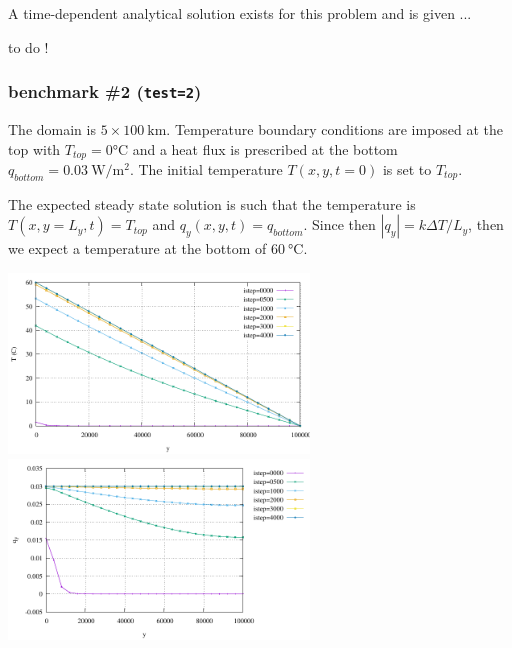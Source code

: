 A time-dependent analytical solution exists for this problem and is given ...

{\color{red} to do !}

\subsubsection*{benchmark \#2 ({\tt test=2})}

The domain is $5\times 100~\si{\km}$. 
Temperature boundary conditions are imposed at the top with 
$T_{top}=0\si{\celsius}$
and a heat flux is prescribed at the bottom 
$q_{bottom}=0.03~\si{\watt\per\square\meter}$.
The initial temperature $T(x,y,t=0)$ is set to $T_{top}$.

The expected steady state solution is such that the temperature is 
$T(x,y=L_y,t)=T_{top}$ and $q_y(x,y,t)=q_{bottom}$. 
Since then $|q_y|=k \Delta T/L_y$, then we expect a temperature at the
bottom of $60~\si{\celsius}$.

\begin{center}
\includegraphics[width=8cm]{python_codes/fieldstone_141/results/test2/temperature}
\includegraphics[width=8cm]{python_codes/fieldstone_141/results/test2/heat_flux}
\end{center}


